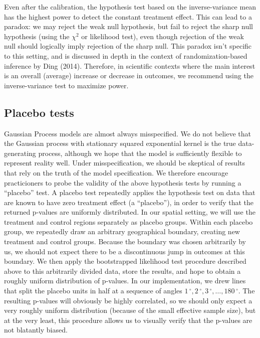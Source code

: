 \documentclass[letter]{article}
\newcommand{\degree}{{\,^\circ}}
\begin{document}
Even after the calibration, the hypothesis test based on the
inverse-variance mean has the highest power to detect the constant
treatment effect. This can lead to a paradox: we may reject the weak
null hypothesis, but fail to reject the sharp null hypothesis (using the
\(\chi^2\) or likelihood test), even though rejection of the weak null
should logically imply rejection of the sharp null. This paradox isn't
specific to this setting, and is discussed in depth in the context of
randomization-based inference by Ding (2014). Therefore, in scientific
contexts where the main interest is an overall (average) increase or
decrease in outcomes, we recommend using the inverse-variance test to
maximize power.
    


    	\subsection{Placebo tests}\label{placebo-tests}

Gaussian Process models are almost always misspecified. We do not
believe that the Gaussian process with stationary squared exponential
kernel is the true data-generating process, although we hope that the
model is sufficiently flexible to represent reality well. Under
misspecification, we should be skeptical of results that rely on the
truth of the model specification. We therefore encourage practicioners
to probe the validity of the above hypothesis tests by running a
``placebo'' test. A placebo test repeatedly applies the hypothesis test
on data that are known to have zero treatment effect (a ``placebo''), in
order to verify that the returned p-values are uniformly distributed. In
our spatial setting, we will use the treatment and control regions
separately as placebo groups. Within each placebo group, we repeatedly
draw an arbitrary geographical boundary, creating new treatment and
control groups. Because the boundary was chosen arbitrarily by us, we
should not expect there to be a discontinuous jump in outcomes at this
boundary. We then apply the bootstrapped likelihood test procedure
described above to this arbitrarily divided data, store the results, and
hope to obtain a roughly uniform distribution of p-values. In our
implementation, we drew lines that split the placebo units in half at a
sequence of angles \(1\degree,2\degree,3\degree,\ldots,180\degree\). The
resulting p-values will obviously be highly correlated, so we should
only expect a very roughly uniform distribution (because of the small
effective sample size), but at the very least, this procedure allows us
to visually verify that the p-values are not blatantly biased.
    
\end{document}
